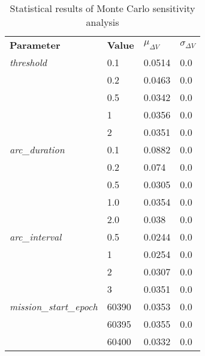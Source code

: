 
                \begin{table}[]
                \centering
                \begin{tabular}{l l l l}
                \rowcolor[HTML]{EFEFEF} \textbf{Parameter} & \textbf{Value} & \textbf{$\mu_{\Delta V}$} & \textbf{$\sigma_{\Delta V}$} \\
                \textit{threshold} & 0.1 & 0.0514 & 0.0 \\
 & 0.2 & 0.0463 & 0.0 \\
 & 0.5 & 0.0342 & 0.0 \\
 & 1 & 0.0356 & 0.0 \\
 & 2 & 0.0351 & 0.0 \\
\textit{arc\_duration} & 0.1 & 0.0882 & 0.0 \\
 & 0.2 & 0.074 & 0.0 \\
 & 0.5 & 0.0305 & 0.0 \\
 & 1.0 & 0.0354 & 0.0 \\
 & 2.0 & 0.038 & 0.0 \\
\textit{arc\_interval} & 0.5 & 0.0244 & 0.0 \\
 & 1 & 0.0254 & 0.0 \\
 & 2 & 0.0307 & 0.0 \\
 & 3 & 0.0351 & 0.0 \\
\textit{mission\_start\_epoch} & 60390 & 0.0353 & 0.0 \\
 & 60395 & 0.0355 & 0.0 \\
 & 60400 & 0.0332 & 0.0 \\

                \end{tabular}
                \caption{Statistical results of Monte Carlo sensitivity analysis}
                \label{tab:SensitivityAnalysis}
                \end{table}
                